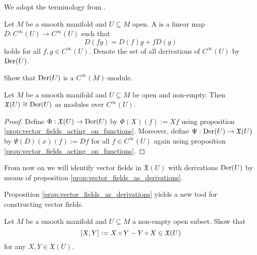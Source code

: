 We adopt the terminology from \cite[218]{weibel:homological_algebra:1994}.

\begin{definition}[Derivation]
	Let $M$ be a smooth manifold and $U \subseteq M$ open. A  is a linear map $D : C^\infty(U) \to C^\infty(U)$ such that
	\begin{equation*}
		D(fg) = D(f)g + fD(g)
	\end{equation*}
	\noindent holds for all $f,g \in C^\infty(U)$. Denote the set of all derivations of $C^\infty(U)$ by $\operatorname{Der}(U)$.
\end{definition}

\begin{exercise}
	Show that $\operatorname{Der}(U)$ is a $C^\infty(M)$-module.
\end{exercise}

\begin{proposition}
	\label{prop:vector_fields_as_derivations}
	Let $M$ be a smooth manifold and $U \subseteq M$ be open and non-empty. Then $\mathfrak{X}(U) \cong \operatorname{Der}(U)$ as modules over $C^\infty(U)$.
\end{proposition}

\begin{proof}
	Define $\Phi : \mathfrak{X}(U) \to \operatorname{Der}(U)$ by $\Phi(X)(f) := Xf$ using proposition \ref{prop:vector_fields_acting_on_functions}. Moreover, define $\Psi : \operatorname{Der}(U) \to \mathfrak{X}(U)$ by $\Psi(D)(x)(f) := Df$ for all $f \in C^\infty(U)$ again using proposition \ref{prop:vector_fields_acting_on_functions}.
\end{proof}

\begin{remark}
	From now on we will identify vector fields in $\mathfrak{X}(U)$ with derivations $\operatorname{Der}(U)$ by means of proposition \ref{prop:vector_fields_as_derivations}. 
\end{remark}

Proposition \ref{prop:vector_fields_as_derivations} yields a new tool for constructing vector fields.

\begin{exercise}
	\label{ex:Lie_bracket_on_vector_fields}
	Let $M$ be a smooth manifold and $U \subseteq M$ a non-empty open subset. Show that 
	\begin{equation*}
		\sbr[0]{X,Y} := X\circ Y - Y\circ X \in \mathfrak{X}(U)
	\end{equation*}
	\noindent for any $X,Y \in \mathfrak{X}(U)$.
\end{exercise}

